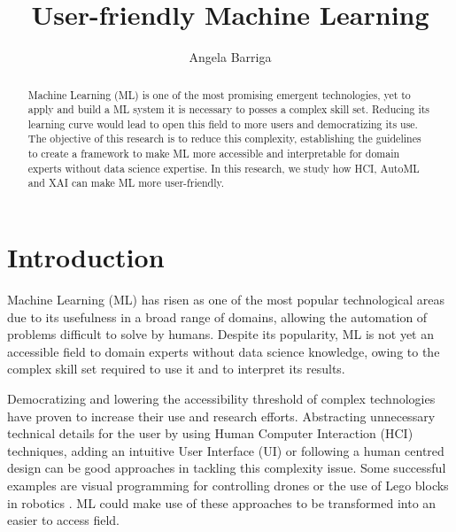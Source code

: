 \documentclass[runningheads]{llncs}
\begin{document}
	\title{User-friendly Machine Learning}
	\author{Angela Barriga}
	\maketitle              %
	\begin{abstract}
	Machine Learning (ML) is one of the most promising emergent technologies, yet to apply
	and build a ML system it is necessary to posses a complex skill set. Reducing its
	learning curve would lead to open this field to more users and democratizing its use. 
	The objective of this research is to reduce this complexity, establishing the guidelines to 
	create a framework to make ML more accessible and interpretable for domain experts without data science expertise. 
	In this research, we study how HCI, AutoML and XAI can make ML more user-friendly.
		
	\end{abstract}
	\section{Introduction}\label{intro}
		
	Machine Learning (ML) has risen as one of the most popular technological areas due to its usefulness in
	a broad range of domains, allowing the automation of problems difficult to solve by humans. Despite its
	popularity, ML is not yet an accessible field to domain experts without data science knowledge, owing
	to the complex skill set required to use it and to interpret its results.  
	
	Democratizing and lowering the accessibility threshold of complex technologies have proven to increase
	their use and research efforts. Abstracting unnecessary technical details for the user by using Human
	Computer Interaction (HCI) techniques, adding an intuitive User Interface (UI) or following a human
	centred design can be good approaches in tackling this complexity issue. Some successful
	examples are visual programming for controlling drones \cite{dronely} or the use of Lego blocks in
	robotics \cite{lego}. ML could make use of these approaches to be transformed into an easier to
	access field. 
	
\end{document}
